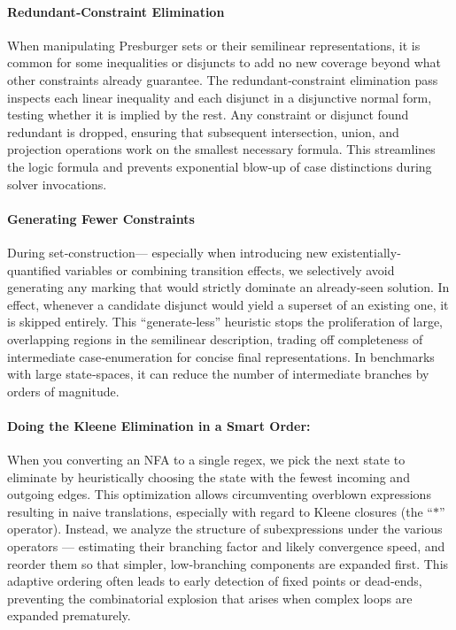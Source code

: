 \paragraph{Redundant‐Constraint Elimination}
When manipulating Presburger sets or their semilinear representations, it is common for some inequalities or disjuncts to add no new coverage beyond what other constraints already guarantee.  The redundant‐constraint elimination pass inspects each linear inequality and each disjunct in a disjunctive normal form, testing whether it is implied by the rest.  Any constraint or disjunct found redundant is dropped, ensuring that subsequent intersection, union, and projection operations work on the smallest necessary formula.  This streamlines the logic formula and prevents exponential blow‐up of case distinctions during solver invocations.
%

\paragraph{Generating Fewer Constraints}
During set‐construction--- especially when introducing new existentially‐quantified variables or combining transition effects, we selectively avoid generating any marking that would strictly dominate an already‐seen solution.  In effect, whenever a candidate disjunct would yield a superset of an existing one, it is skipped entirely.  This ``generate‐less” heuristic stops the proliferation of large, overlapping regions in the semilinear description, trading off completeness of intermediate case‐enumeration for concise final representations.  In benchmarks with large state‐spaces, it can reduce the number of intermediate branches by orders of magnitude.


\paragraph{Doing the Kleene Elimination in a Smart Order:}
When you converting an NFA to a single regex, we pick the next state to eliminate by heuristically choosing the  state with the fewest incoming and outgoing edges.
This optimization allows circumventing 
overblown expressions resulting in naive translations, especially with regard to  Kleene closures (the “\(\mathsf{*}\)” operator).  Instead, we analyze the structure of subexpressions under the various operators --- estimating their branching factor and likely convergence speed, and reorder them so that simpler, low‐branching components are expanded first.  This adaptive ordering often leads to early detection of fixed points or dead‐ends, preventing the combinatorial explosion that arises when complex loops are expanded prematurely.  



